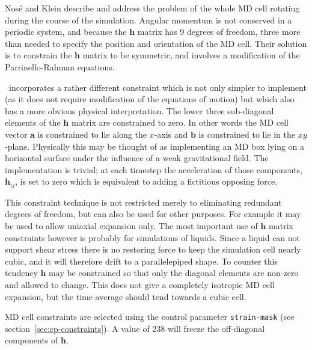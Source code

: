 Nos\'{e} and Klein\cite{nose:83} describe and address the problem of
the whole MD cell rotating during the course of the simulation.
Angular momentum is not conserved in a periodic system, and because
the $\bm{h}$ matrix has 9 degrees of freedom, three more than needed
to specify the position and orientation of the MD cell.  Their
solution is to constrain the $\bm{h}$ matrix to be symmetric, and
involves a modification of the Parrinello-Rahman equations.

\moldy\ incorporates a rather different constraint which is not only
simpler to implement (as it does not require modification of the
equations of motion) but which also has a more obvious physical
interpretation.  The lower three sub-diagonal elements of the $\bm{h}$
matrix are constrained to zero.  In other words the MD cell vector
$\bm{a}$ is constrained to lie along the $x$-axis and $\bm{b}$ is
constrained to lie in the $xy$-plane.  Physically this may be thought
of as implementing an MD box lying on a horizontal surface under the
influence of a weak gravitational field.  The implementation is
trivial; at each timestep the acceleration of those components,
$\ddot{\bm{h}}_{ij}$, is set to zero which is equivalent to adding a
fictitious opposing force.

This constraint technique is not restricted merely to eliminating
redundant degrees of freedom, but can also be used for other purposes.
For example it may be used to allow uniaxial expansion only.  The most
important use of $\bm{h}$ matrix constraints however is probably for
simulations of liquids.  Since a liquid can not support shear stress
there is no restoring force to keep the simulation cell nearly cubic,
and it will therefore drift to a parallelepiped shape.  To counter
this tendency $\bm{h}$ may be constrained so that only the diagonal
elements are non-zero and allowed to change.  This does not give a
completely isotropic MD cell expansion, but the time average should
tend towards a cubic cell.

MD cell constraints are selected using the control parameter
\verb'strain-mask' (see section~\ref{sec:cp-constraints}).  A value of
238 will freeze the off-diagonal components of $\bm{h}$.

